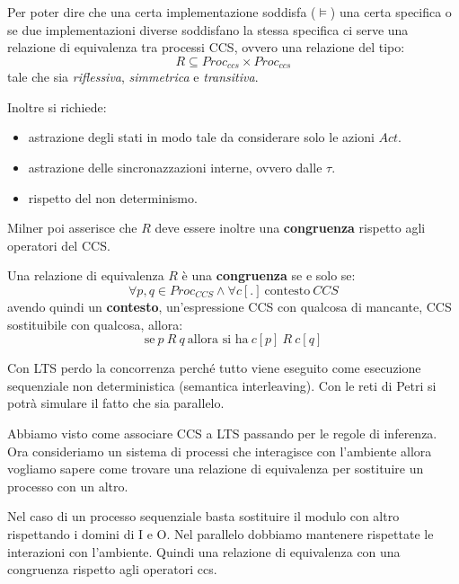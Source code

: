 Per poter dire che una certa implementazione soddisfa ($\models$) una certa
specifica o se due implementazioni diverse soddisfano la stessa specifica ci
serve una relazione di equivalenza tra processi CCS, ovvero una relazione del
tipo:
\begin{equation}
    R \subseteq Proc_{ccs} \times Proc_{ccs}
\end{equation}
tale che sia \textit{riflessiva}, \textit{simmetrica} e \textit{transitiva}.

Inoltre si richiede:
\begin{itemize}
    \item astrazione degli stati in modo tale da considerare solo le azioni $Act$.
    \item astrazione delle sincronazzazioni interne, ovvero dalle $\tau$.
    \item rispetto del non determinismo.
\end{itemize}
Milner poi asserisce che $R$ deve essere inoltre una \textbf{congruenza} rispetto
agli operatori del CCS.
\begin{definizione}
    Una relazione di equivalenza $R$ è una \textbf{congruenza} se e solo se:
    \begin{equation}
        \forall p, q \in Proc_{CCS} \land \forall c[.] \ \text{contesto} \ CCS
    \end{equation}
    avendo quindi un \textbf{contesto}, un'espressione CCS con qualcosa di mancante,
    CCS sostituibile con qualcosa, allora:
    \begin{equation}
        \text{se} \ p\ R\ q \ \text{allora si ha} \ c[p] \ R \ c[q]
    \end{equation}
\end{definizione}
Con LTS perdo la concorrenza perché tutto viene eseguito come esecuzione
sequenziale non deterministica (semantica interleaving). Con le reti di Petri
si potrà simulare il fatto che sia parallelo.

Abbiamo visto come associare CCS a LTS passando per le regole di inferenza.
Ora consideriamo un sistema di processi che interagisce con l'ambiente allora
vogliamo sapere come trovare una relazione di equivalenza per sostituire un
processo con un altro.

Nel caso di un processo sequenziale basta sostituire il modulo con altro
rispettando i domini di I e O. Nel parallelo dobbiamo mantenere rispettate
le interazioni con l'ambiente. Quindi una relazione di equivalenza con una
congruenza rispetto agli operatori ccs.


